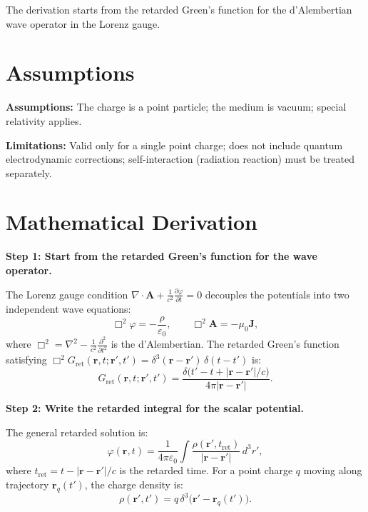The derivation starts from the retarded Green's function for the d'Alembertian wave operator in the Lorenz gauge.

\section*{Assumptions}

\textbf{Assumptions:} The charge is a point particle; the medium is vacuum; special relativity applies.


\textbf{Limitations:} Valid only for a single point charge; does not include quantum electrodynamic corrections; self-interaction (radiation reaction) must be treated separately.


\section*{Mathematical Derivation}

\textbf{Step 1: Start from the retarded Green's function for the wave operator.}

The Lorenz gauge condition $\nabla\cdot\mathbf{A} + \frac{1}{c^{2}}\frac{\partial\varphi}{\partial t} = 0$ decouples the potentials into two independent wave equations:
\begin{equation}
\Box^{2}\varphi = -\frac{\rho}{\varepsilon_{0}}, \qquad \Box^{2}\mathbf{A} = -\mu_{0}\mathbf{J},
\end{equation}
where $\Box^{2} = \nabla^{2} - \frac{1}{c^{2}}\frac{\partial^{2}}{\partial t^{2}}$ is the d'Alembertian. The retarded Green's function satisfying $\Box^{2}G_{\text{ret}}(\mathbf{r},t;\mathbf{r}',t') = \delta^{3}(\mathbf{r}-\mathbf{r}')\,\delta(t-t')$ is:
\begin{equation}
G_{\text{ret}}(\mathbf{r},t;\mathbf{r}',t') = \frac{\delta\!\bigl(t' - t + |\mathbf{r}-\mathbf{r}'|/c\bigr)}{4\pi|\mathbf{r}-\mathbf{r}'|}.
\end{equation}

\textbf{Step 2: Write the retarded integral for the scalar potential.}

The general retarded solution is:
\begin{equation}
\varphi(\mathbf{r},t) = \frac{1}{4\pi\varepsilon_{0}}\int \frac{\rho(\mathbf{r}',t_{\text{ret}})}{|\mathbf{r}-\mathbf{r}'|}\,d^{3}r',
\label{eq:retarded-phi-integral}
\end{equation}
where $t_{\text{ret}} = t - |\mathbf{r}-\mathbf{r}'|/c$ is the retarded time. For a point charge $q$ moving along trajectory $\mathbf{r}_{q}(t')$, the charge density is:
\begin{equation}
\rho(\mathbf{r}',t') = q\,\delta^{3}\!\bigl(\mathbf{r}' - \mathbf{r}_{q}(t')\bigr).
\end{equation}

